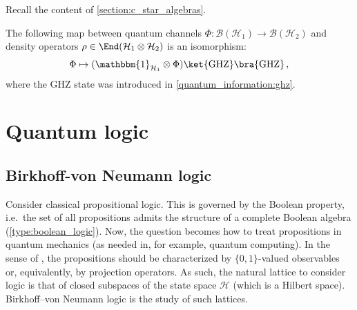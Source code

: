     Recall the content of \cref{section:c_star_algebras}.

    \begin{theorem}
        The following map between quantum channels $\Phi:\mathcal{B}(\mathcal{H}_1)\rightarrow\mathcal{B}(\mathcal{H}_2)$ and density operators $\rho\in\End(\mathcal{H}_1\otimes\mathcal{H}_2)$ is an isomorphism:
        \begin{gather}
            \Phi\mapsto(\mathbbm{1}_{\mathcal{H}_1}\otimes\Phi)\ket{\mathrm{GHZ}}\bra{\mathrm{GHZ}}\,,
        \end{gather}
        where the GHZ state was introduced in \cref{quantum_information:ghz}.
    \end{theorem}

\section{Quantum logic}
\subsection{Birkhoff-von Neumann logic}

    Consider classical propositional logic. This is governed by the Boolean property, i.e.~the set of all propositions admits the structure of a complete Boolean algebra (\cref{type:boolean_logic}). Now, the question becomes how to treat propositions in quantum mechanics (as needed in, for example, quantum computing). In the sense of , the propositions should be characterized by $\{0,1\}$-valued observables or, equivalently, by projection operators. As such, the natural lattice to consider logic is that of closed subspaces of the state space $\mathcal{H}$ (which is a Hilbert space). Birkhoff--von Neumann logic is the study of such lattices.

